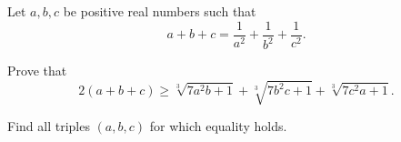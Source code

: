 Let $ a, b, c$ be positive real numbers such that\[ a+b+c=\frac{1}{a^2} + \frac{1}{b^2} + \frac{1}{c^2}  . \]

Prove that\[ 2(a+b+c) \ge \sqrt[3]{7 a^2 b +1 } + \sqrt[3]{7 b^2 c +1 } + \sqrt[3]{7 c^2 a +1 } . \]

Find all triples $ (a,b,c) $ for which equality holds.